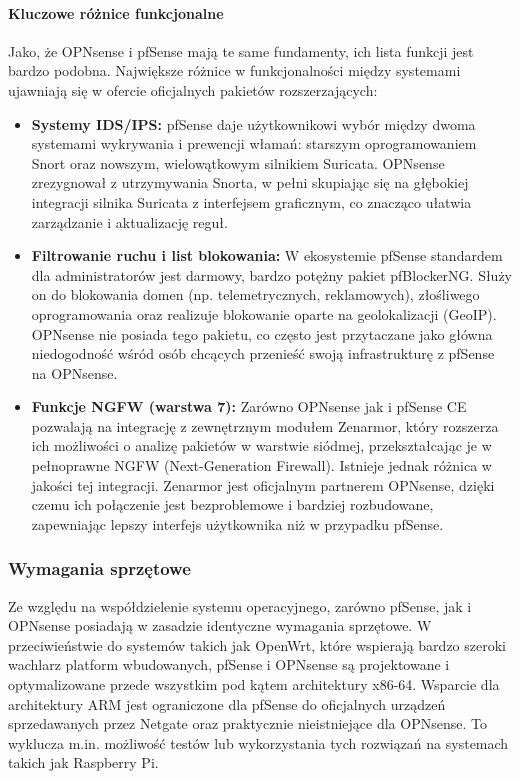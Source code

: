 \documentclass[12pt,a4paper]{article}
\begin{document}
\paragraph{Kluczowe różnice funkcjonalne}
Jako, że OPNsense i pfSense mają te same fundamenty, ich lista funkcji jest bardzo podobna. Największe różnice w funkcjonalności między systemami ujawniają się w ofercie oficjalnych pakietów rozszerzających:

\begin{itemize}
    \item \textbf{Systemy IDS/IPS:} pfSense daje użytkownikowi wybór między dwoma systemami wykrywania i prewencji włamań: starszym oprogramowaniem Snort oraz nowszym, wielowątkowym silnikiem Suricata. OPNsense zrezygnował z utrzymywania Snorta, w pełni skupiając się na głębokiej integracji silnika Suricata z interfejsem graficznym, co znacząco ułatwia zarządzanie i aktualizację reguł.
    
    \item \textbf{Filtrowanie ruchu i list blokowania:} W ekosystemie pfSense standardem dla administratorów jest darmowy, bardzo potężny pakiet pfBlockerNG. Służy on do blokowania domen (np. telemetrycznych, reklamowych), złośliwego oprogramowania oraz realizuje blokowanie oparte na geolokalizacji (GeoIP). OPNsense nie posiada tego pakietu, co często jest przytaczane jako główna niedogodność wśród osób chcących przenieść swoją infrastrukturę z pfSense na OPNsense.
    
    \item \textbf{Funkcje NGFW (warstwa 7):} Zarówno OPNsense jak i pfSense CE pozwalają na integrację z zewnętrznym modułem Zenarmor, który rozszerza ich możliwości o analizę pakietów w warstwie siódmej, przekształcając je w pełnoprawne NGFW (Next-Generation Firewall). Istnieje jednak różnica w jakości tej integracji. Zenarmor jest oficjalnym partnerem OPNsense, dzięki czemu ich połączenie jest bezproblemowe i bardziej rozbudowane, zapewniając lepszy interfejs użytkownika niż w przypadku pfSense.
\end{itemize}

\subsubsection{Wymagania sprzętowe}
Ze względu na współdzielenie systemu operacyjnego, zarówno pfSense, jak i OPNsense posiadają w zasadzie identyczne wymagania sprzętowe. W przeciwieństwie do systemów takich jak OpenWrt, które wspierają bardzo szeroki wachlarz platform wbudowanych, pfSense i OPNsense są projektowane i optymalizowane przede wszystkim pod kątem architektury x86-64. Wsparcie dla architektury ARM jest ograniczone dla pfSense do oficjalnych urządzeń sprzedawanych przez Netgate oraz praktycznie nieistniejące dla OPNsense. To wyklucza m.in. możliwość testów lub wykorzystania tych rozwiązań na systemach takich jak Raspberry Pi.
\end{document}
